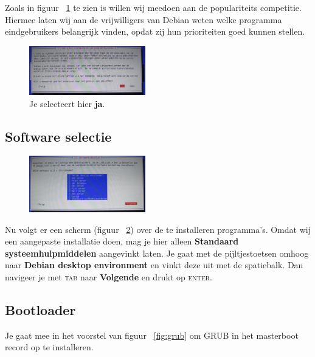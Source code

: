 \documentclass[12pt,a4paper]{article}
\begin{document}
Zoals in figuur ~\ref{fig:popcon} te zien is willen wij meedoen aan de populariteits competitie. Hiermee laten wij aan de vrijwilligers van Debian weten welke programma eindgebruikers belangrijk vinden, opdat zij hun prioriteiten goed kunnen stellen.

\begin{figure}[H]
\centering
\includegraphics[width=0.45\textwidth]{populariteits-contest-scherm}
\caption{Je selecteert hier \textbf{ja}.}
\label{fig:popcon}
\end{figure}

\subsection{Software selectie}

\begin{figure}[H]
\centering
\includegraphics[width=0.45\textwidth]{software-selectie-scherm}
\label{fig:software-selectie-scherm}
\end{figure}

Nu volgt er een scherm (figuur ~\ref{fig:software-selectie-scherm}) over de te installeren programma's. Omdat wij een aangepaste installatie doen, mag je hier alleen \textbf{Standaard systeemhulpmiddelen} aangevinkt laten. Je gaat met de pijltjestoetsen omhoog naar \textbf{Debian desktop environment} en vinkt deze uit met de spatiebalk. Dan navigeer je met \textsc{tab} naar \textbf{Volgende} en drukt op \textsc{enter}.

\subsection{Bootloader}

Je gaat mee in het voorstel van figuur ~\ref{fig:grub} om GRUB in het masterboot record op te installeren.
\end{document}
